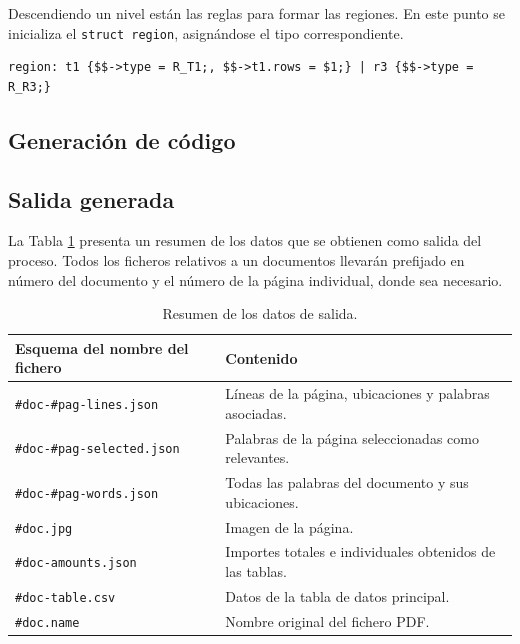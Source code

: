 Descendiendo un nivel están las reglas para formar las regiones. En este punto se inicializa el \verb|struct region|, asignándose el tipo correspondiente.

\begin{lstlisting}[caption={},label={}]
region: t1 {$$->type = R_T1;, $$->t1.rows = $1;} | r3 {$$->type = R_R3;}
\end{lstlisting}

\subsection{Generación de código}









\subsection{Salida generada}

La Tabla \ref{tab:datos-de-salida} presenta un resumen de los datos que se obtienen como salida del proceso. Todos los ficheros relativos a un documentos llevarán prefijado en número del documento y el número de la página individual, donde sea necesario.

\begin{table}[ht]
    \centering
    \begin{tabular}{l l}
        Esquema del nombre del fichero & Contenido \\
        \hline
        \hline
        \verb|#doc-#pag-lines.json| & Líneas de la página, ubicaciones y palabras asociadas. \\
        \verb|#doc-#pag-selected.json| & Palabras de la página seleccionadas como relevantes. \\
        \verb|#doc-#pag-words.json| & Todas las palabras del documento y sus ubicaciones. \\
        \verb|#doc.jpg| & Imagen de la página. \\
        \verb|#doc-amounts.json| & Importes totales e individuales obtenidos de las tablas. \\
        \verb|#doc-table.csv| & Datos de la tabla de datos principal. \\
        \verb|#doc.name| & Nombre original del fichero PDF.\\
    \end{tabular}
    \caption{Resumen de los datos de salida.}    
    \label{tab:datos-de-salida}
\end{table}

